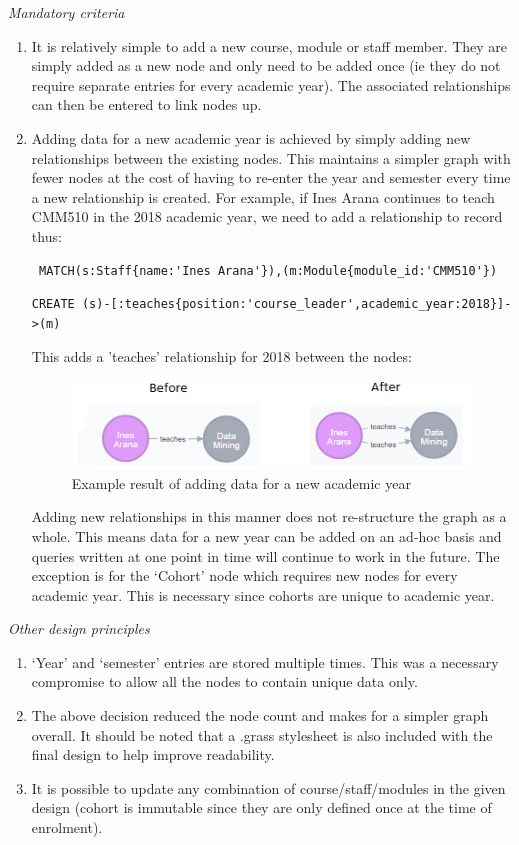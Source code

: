 \documentclass[10pt]{article}
\begin{document}
\textit{Mandatory criteria}\\
\begin{enumerate}

\item It is relatively simple to add a new course, module or staff member. They are simply added as a new node and only need to be added once (ie they do not require separate entries for every academic year). The associated relationships can then be entered to link nodes up.
\item Adding data for a new academic year is achieved by simply adding new relationships between the existing nodes. This maintains a simpler graph with fewer nodes at the cost of having to re-enter the year and semester every time a new relationship is created.
For example, if Ines Arana continues to teach CMM510 in the 2018 academic year, we need to add a relationship to record thus:


\begin{verbatim}
 MATCH(s:Staff{name:'Ines Arana'}),(m:Module{module_id:'CMM510'}) 
\end{verbatim}
\begin{verbatim}
CREATE (s)-[:teaches{position:'course_leader',academic_year:2018}]->(m)
\end{verbatim}
This adds a 'teaches' relationship for 2018 between the nodes:
\begin{figure}[h]
\centering
\includegraphics[scale=1]{change}
\caption{Example result of adding data for a new academic year}

\end{figure}

Adding new relationships in this manner does not re-structure the graph as a whole. This means data for a new year can be added on an ad-hoc basis and queries written at one point in time will continue to work in the future. 
The exception is for the ‘Cohort’ node which requires new nodes for every academic year. This is necessary since cohorts are unique to academic year.
\end{enumerate}

\textit{Other design principles}
\begin{enumerate}[label=\Alph*]
\item ‘Year’ and ‘semester’ entries are stored multiple times. This was a necessary compromise to allow all the nodes to contain unique data only.
\item The above decision reduced the node count and makes for a simpler graph overall. It should be noted that a .grass stylesheet is also included with the final design to help improve readability.
\item It is possible to update any combination of course/staff/modules in the given design (cohort is immutable since they are only defined once at the time of enrolment).
\end{enumerate}
\end{document}
